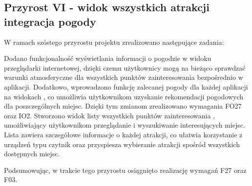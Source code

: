 
    \subsection{Przyrost VI - widok wszystkich atrakcji integracja pogody}
    \label{sec:przyrost6}

    W ramach szóstego przyrostu projektu zrealizowano następujące zadania:
  
    \indent Dodano funkcjonalność wyświetlania informacji o pogodzie w widoku 
    przeglądarki internetowej, dzięki czemu użytkownicy mogą na bieżąco sprawdzać warunki atmosferyczne dla wszystkich punktów zainteresowania bezpośrednio w aplikacji. 
    Dodatkowo, wprowadzono funkcję zalecanej pogody dla każdej aplikacji na widokach , 
    co umożliwia użytkownikom uzyskanie rekomendacji pogodowych dla poszczególnych miejsc. Dzięki tym zmianom zrealizowano wymagania FO27 oraz IO2.
    \indent Stworzono widok listy wszystkich punktów zainteresowania , umożliwiający użytkownikom 
    przeglądanie i wyszukiwanie interesujących miejsc. Lista zawiera szczegółowe informacje 
    o każdej atrakcji, co ułatwia korzystanie z urządzeń 
    typu czytnik oraz przyspiesza wybieranie atrakcji spośród wszystkich dostępnych miejsc. 
    
    Podsumowując, w trakcie tego przyrostu osiągnięto realizację wymagań F27 oraz F03.


